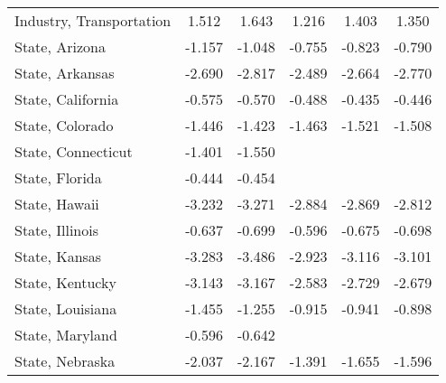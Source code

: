 {\begin{tabular}{l*{5}{c}}
\addlinespace
Industry, Transportation &       1.512\sym{*}  &       1.643\sym{**} &       1.216         &       1.403\sym{*}  &       1.350\sym{*}  \\
\addlinespace
State, Arizona           &      -1.157\sym{**} &      -1.048\sym{**} &      -0.755         &      -0.823\sym{*}  &      -0.790         \\
\addlinespace
State, Arkansas          &      -2.690\sym{***}&      -2.817\sym{***}&      -2.489\sym{***}&      -2.664\sym{***}&      -2.770\sym{***}\\
\addlinespace
State, California        &      -0.575\sym{*}  &      -0.570\sym{**} &      -0.488\sym{*}  &      -0.435         &      -0.446         \\
\addlinespace
State, Colorado          &      -1.446\sym{**} &      -1.423\sym{**} &      -1.463\sym{**} &      -1.521\sym{***}&      -1.508\sym{***}\\
\addlinespace
State, Connecticut       &      -1.401         &      -1.550         &                     &                     &                     \\
\addlinespace
State, Florida           &      -0.444         &      -0.454         &                     &                     &                     \\
\addlinespace
State, Hawaii            &      -3.232\sym{***}&      -3.271\sym{***}&      -2.884\sym{***}&      -2.869\sym{***}&      -2.812\sym{***}\\
\addlinespace
State, Illinois          &      -0.637         &      -0.699\sym{*}  &      -0.596         &      -0.675\sym{*}  &      -0.698\sym{*}  \\
\addlinespace
State, Kansas            &      -3.283\sym{**} &      -3.486\sym{**} &      -2.923\sym{*}  &      -3.116\sym{**} &      -3.101\sym{*}  \\
\addlinespace
State, Kentucky          &      -3.143\sym{***}&      -3.167\sym{***}&      -2.583\sym{***}&      -2.729\sym{***}&      -2.679\sym{***}\\
\addlinespace
State, Louisiana         &      -1.455\sym{*}  &      -1.255\sym{*}  &      -0.915         &      -0.941         &      -0.898         \\
\addlinespace
State, Maryland          &      -0.596         &      -0.642         &                     &                     &                     \\
\addlinespace
State, Nebraska          &      -2.037\sym{*}  &      -2.167\sym{*}  &      -1.391         &      -1.655         &      -1.596         \\

\end{tabular}}

